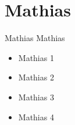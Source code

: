 \section{Mathias}
\begin{frame}{Mathias}{}
  Mathias
  \begin{itemize}
    \item<1-> Mathias 1
    \item<2-> Mathias 2
    \item<3-> Mathias 3
    \item<4-> Mathias 4
  \end{itemize}
\end{frame}
